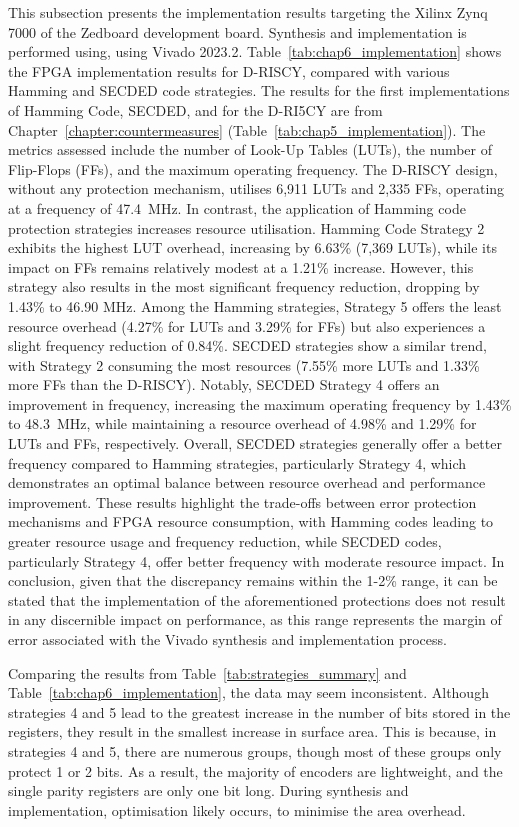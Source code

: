 This subsection presents the implementation results targeting the Xilinx Zynq 7000 of the Zedboard development board. Synthesis and implementation is performed using, using Vivado 2023.2.
Table~\ref{tab:chap6_implementation} shows the FPGA implementation results for D-RISCY, compared with various Hamming and SECDED code strategies. The results for the first implementations of Hamming Code, SECDED, and for the D-RI5CY are from Chapter~\ref{chapter:countermeasures} (Table~\ref{tab:chap5_implementation}). The metrics assessed include the number of Look-Up Tables (LUTs), the number of Flip-Flops (FFs), and the maximum operating frequency. The D-RISCY design, without any protection mechanism, utilises 6,911 LUTs and 2,335 FFs, operating at a frequency of \SI{47.4}{\mega\hertz}. In contrast, the application of Hamming code protection strategies increases resource utilisation. Hamming Code Strategy 2 exhibits the highest LUT overhead, increasing by 6.63\% (7,369 LUTs), while its impact on FFs remains relatively modest at a 1.21\% increase. However, this strategy also results in the most significant frequency reduction, dropping by 1.43\% to 46.90 MHz. Among the Hamming strategies, Strategy 5 offers the least resource overhead (4.27\% for LUTs and 3.29\% for FFs) but also experiences a slight frequency reduction of 0.84\%.
SECDED strategies show a similar trend, with Strategy 2 consuming the most resources (7.55\% more LUTs and 1.33\% more FFs than the D-RISCY). Notably, SECDED Strategy 4 offers an improvement in frequency, increasing the maximum operating frequency by 1.43\% to \SI{48.3}{\mega\hertz}, while maintaining a resource overhead of 4.98\% and 1.29\% for LUTs and FFs, respectively. Overall, SECDED strategies generally offer a better frequency compared to Hamming strategies, particularly Strategy 4, which demonstrates an optimal balance between resource overhead and performance improvement. These results highlight the trade-offs between error protection mechanisms and FPGA resource consumption, with Hamming codes leading to greater resource usage and frequency reduction, while SECDED codes, particularly Strategy 4, offer better frequency with moderate resource impact. In conclusion, given that the discrepancy remains within the 1-2\% range, it can be stated that the implementation of the aforementioned protections does not result in any discernible impact on performance, as this range represents the margin of error associated with the Vivado synthesis and implementation process.

Comparing the results from Table~\ref{tab:strategies_summary} and Table~\ref{tab:chap6_implementation}, the data may seem inconsistent. Although strategies 4 and 5 lead to the greatest increase in the number of bits stored in the registers, they result in the smallest increase in surface area. This is because, in strategies 4 and 5, there are numerous groups, though most of these groups only protect 1 or 2 bits. As a result, the majority of encoders are lightweight, and the single parity registers are only one bit long. During synthesis and implementation, optimisation likely occurs, to minimise the area overhead.

